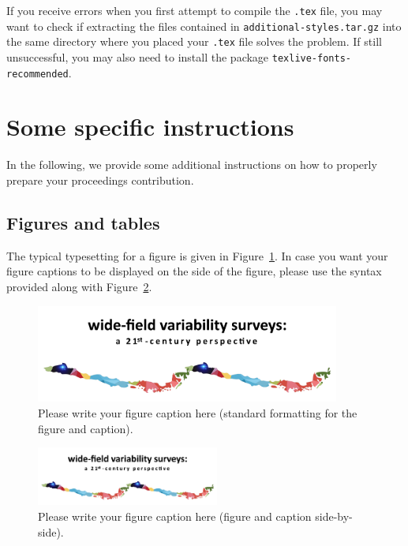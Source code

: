 \documentclass{webofc}
\begin{document}
If you receive errors when you first attempt to compile the \lstinline!.tex! file, you may want to check if extracting the files contained in \lstinline!additional-styles.tar.gz! into the same directory where you placed your \lstinline!.tex! file solves the problem. If still unsuccessful, you may also need to install the package \lstinline!texlive-fonts-recommended!. 


\section{Some specific instructions}\label{sec:sec-1}
In the following, we provide some additional instructions on how to properly prepare your proceedings contribution. 

\subsection{Figures and tables}\label{sec:figs-tabs}
The typical typesetting for a figure is given in Figure~\ref{fig:fig-1}. In case you want your figure captions to be displayed on the side of the figure, please use the syntax provided along with Figure~\ref{fig:fig-2}. 

\begin{figure}
\centering
\includegraphics[width=10cm,clip]{figure-epjwc.pdf}
\caption{Please write your figure caption here  (standard formatting for the figure and caption).}
\label{fig:fig-1}       %
\end{figure}

\begin{figure}
\centering
\sidecaption
\includegraphics[width=6cm,clip]{figure-epjwc.pdf}
\caption{Please write your figure caption here (figure and caption side-by-side).}
\label{fig:fig-2}       %
\end{figure}
\end{document}
